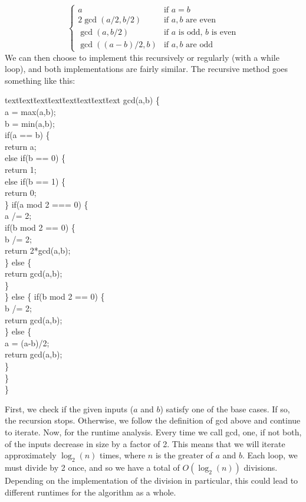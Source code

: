 \documentclass{article}
\begin{document}
\begin{solution}
\begin{itemize}
$$\begin{cases}
	a & \text{if $a=b$} \\
	2\gcd(a/2,b/2) & \text{if $a,b$ are even} \\
	\gcd(a,b/2) & \text{if $a$ is odd, $b$ is even} \\
	\gcd((a-b)/2,b) & \text{if $a,b$ are odd}
	\end{cases}$$
\noindent
We can then choose to implement this recursively or regularly (with a while loop), and both implementations are fairly similar.  The recursive method goes something like this:
\begin{tabbing}
 text\= text\= text\= text\= text\= text\= text\= text\kill
gcd(a,b) \{\\
	\> a = max(a,b);\\
	\> b = min(a,b);\\
	\> if(a == b) \{\\
		\>\> return a;\\
	\> else if(b == 0) \{\\
		\>\> return 1;\\
	\> else if(b == 1) \{\\
		\>\> return 0;\\
	\>\}
	\> if(a mod 2 === 0) \{\\
		\>\> a /= 2;\\
		\>\> if(b mod 2 == 0) \{\\
			\>\>\> b /= 2;\\
			\>\>\> return 2*gcd(a,b);\\
		\>\>\} else \{\\
			\>\>\> return gcd(a,b);\\
		\>\>\}\\
	\>\} else \{
		\>\> if(b mod 2 == 0) \{\\
			\>\>\> b /= 2;\\
			\>\>\> return gcd(a,b);\\
		\>\>\} else \{\\
			\>\>\> a = (a-b)/2;\\
			\>\>\> return gcd(a,b);\\
		\>\>\}\\
	\>\}\\
\}\\		
\end{tabbing}
\noindent
First, we check if the given inputs ($a$ and $b$) satisfy one of the base cases.  If so, the recursion stops.  Otherwise, we follow the definition of gcd above and  continue to iterate.  Now, for the runtime analysis.  Every time we call gcd, one, if not both, of the inputs decrease in size by a factor of 2.  This means that we will iterate approximately $\log_2(n)$ times, where $n$ is the greater of $a$ and $b$.  Each loop, we must divide by 2 once, and so we have a total of $O(\log_2(n))$ divisions.  Depending on the implementation of the division in particular, this could lead to different runtimes for the algorithm as a whole.
\end{itemize}
\end{solution}
\end{document}
